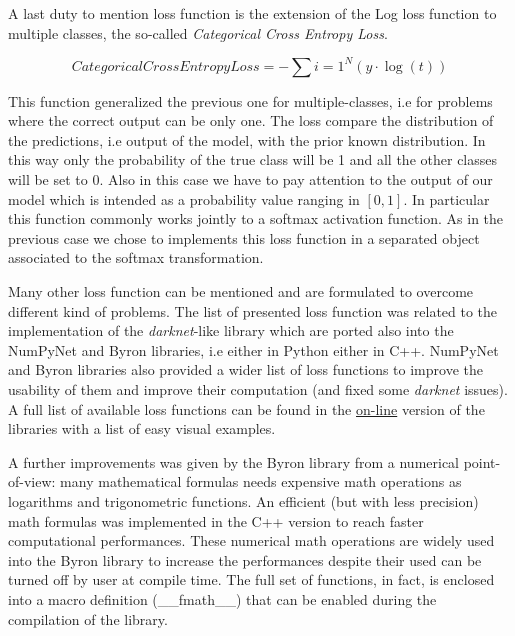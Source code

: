 \documentclass{standalone}
\begin{document}
A last duty to mention loss function is the extension of the Log loss function to multiple classes, the so-called \emph{Categorical Cross Entropy Loss}.

$$
CategoricalCrossEntropyLoss = -\sum{i=1}^{N}\left( y\cdot\log(t) \right)
$$

This function generalized the previous one for multiple-classes, i.e for problems where the correct output can be only one.
The loss compare the distribution of the predictions, i.e output of the model, with the prior known distribution.
In this way only the probability of the true class will be 1 and all the other classes will be set to 0.
Also in this case we have to pay attention to the output of our model which is intended as a probability value ranging in $[0, 1]$.
In particular this function commonly works jointly to a softmax activation function.
As in the previous case we chose to implements this loss function in a separated object associated to the softmax transformation.

Many other loss function can be mentioned and are formulated to overcome different kind of problems.
The list of presented loss function was related to the implementation of the \emph{darknet}-like library which are ported also into the NumPyNet and Byron libraries, i.e either in Python either in C++.
NumPyNet and Byron libraries also provided a wider list of loss functions to improve the usability of them and improve their computation (and fixed some \emph{darknet} issues).
A full list of available loss functions can be found in the \href{https://github.com/Nico-Curti/Byron/blob/master/src/cost_layer.cpp}{on-line} version of the libraries with a list of easy visual examples.

A further improvements was given by the Byron library from a numerical point-of-view: many mathematical formulas needs expensive math operations as logarithms and trigonometric functions.
An efficient (but with less precision) math formulas was implemented in the C++ version to reach faster computational performances.
These numerical math operations are widely used into the Byron library to increase the performances despite their used can be turned off by user at compile time.
The full set of functions, in fact, is enclosed into a macro definition (\textsf{\_\_fmath\_\_}) that can be enabled during the compilation of the library.
\end{document}
